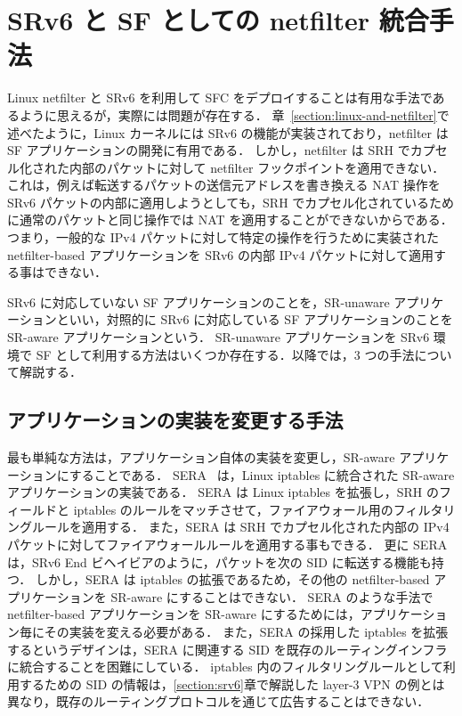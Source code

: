 \section{SRv6 と SF としての netfilter 統合手法}
\label{section:netfilter-as-nf}
Linux netfilter と SRv6 を利用して SFC をデプロイすることは有用な手法であるように思えるが，実際には問題が存在する．
章~\ref*{section:linux-and-netfilter}で述べたように，Linux カーネルには SRv6 の機能が実装されており，netfilter は SF アプリケーションの開発に有用である．
しかし，netfilter は SRH でカプセル化された内部のパケットに対して netfilter フックポイントを適用できない．
これは，例えば転送するパケットの送信元アドレスを書き換える NAT 操作を SRv6 パケットの内部に適用しようとしても，SRH でカプセル化されているために通常のパケットと同じ操作では NAT を適用することができないからである．
つまり，一般的な IPv4 パケットに対して特定の操作を行うために実装された netfilter-based アプリケーションを SRv6 の内部 IPv4 パケットに対して適用する事はできない．

SRv6 に対応していない SF アプリケーションのことを，SR-unaware アプリケーションといい，対照的に SRv6 に対応している SF アプリケーションのことを SR-aware アプリケーションという．
SR-unaware アプリケーションを SRv6 環境で SF として利用する方法はいくつか存在する．以降では，3 つの手法について解説する．

\subsection{アプリケーションの実装を変更する手法}
\label{sbsection:change-impl}
最も単純な方法は，アプリケーション自体の実装を変更し，SR-aware アプリケーションにすることである．
SERA~\cite{sera} は，Linux iptables に統合された SR-aware アプリケーションの実装である．
SERA は Linux iptables を拡張し，SRH のフィールドと iptables のルールをマッチさせて，ファイアウォール用のフィルタリングルールを適用する．
また，SERA は SRH でカプセル化された内部の IPv4 パケットに対してファイアウォールルールを適用する事もできる．
更に SERA は，SRv6 End ビヘイビアのように，パケットを次の SID に転送する機能も持つ．
しかし，SERA は iptables の拡張であるため，その他の netfilter-based アプリケーションを SR-aware にすることはできない．
SERA のような手法で netfilter-based アプリケーションを SR-aware にするためには，アプリケーション毎にその実装を変える必要がある．
また，SERA の採用した iptables を拡張するというデザインは，SERA に関連する SID を既存のルーティングインフラに統合することを困難にしている．
iptables 内のフィルタリングルールとして利用するための SID の情報は，\ref*{section:srv6}章で解説した layer-3 VPN の例とは異なり，既存のルーティングプロトコルを通じて広告することはできない．

